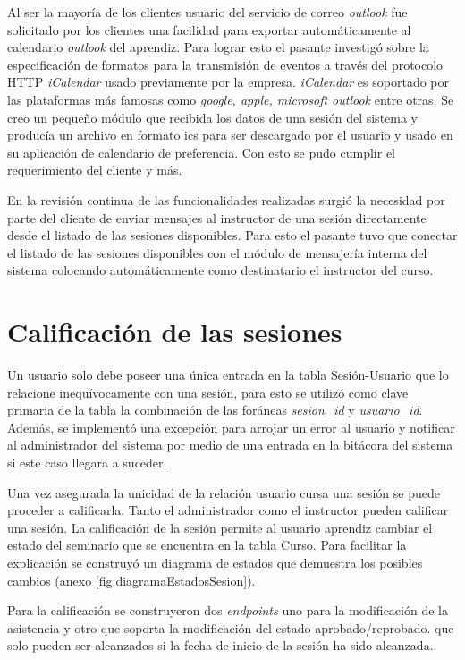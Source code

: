 	Al ser la mayoría de los clientes usuario del servicio de correo \emph{outlook} fue solicitado por los clientes una facilidad para exportar automáticamente al calendario \emph{outlook} del aprendiz. Para lograr esto el pasante investigó sobre la especificación de formatos para la transmisión de eventos a través del protocolo HTTP \emph{iCalendar} usado previamente por la empresa. \emph{iCalendar} es soportado por las plataformas más famosas como \emph{google, apple, microsoft outlook} entre otras. Se creo un pequeño módulo que recibida los datos de una sesión del sistema y producía un archivo en formato ics para ser descargado por el usuario y usado en su aplicación de calendario de preferencia. Con esto se pudo cumplir el requerimiento del cliente y más.

	En la revisión continua de las funcionalidades realizadas surgió la necesidad por parte del cliente de enviar mensajes al instructor de una sesión directamente desde el listado de las sesiones disponibles. Para esto el pasante tuvo que conectar el listado de las sesiones disponibles con el módulo de mensajería interna del sistema colocando automáticamente como destinatario el instructor del curso.

	\section{Calificación de las sesiones} %
	\label{sec:calificacion_de_las_sesiones}
	
	Un usuario solo debe poseer una única entrada en la tabla Sesión-Usuario que lo relacione inequívocamente con una sesión, para esto se utilizó como clave primaria de la tabla la combinación de las foráneas \emph{sesion\_id} y \emph{usuario\_id}. Además, se implementó una excepción para arrojar un error al usuario y notificar al administrador del sistema por medio de una entrada en la bitácora del sistema si este caso llegara a suceder.

	Una vez asegurada la unicidad de la relación usuario cursa una sesión se puede proceder a calificarla. Tanto el administrador como el instructor pueden calificar una sesión. La calificación de la sesión permite al usuario aprendiz cambiar el estado del seminario que se encuentra en la tabla Curso. Para facilitar la explicación se construyó un diagrama de estados que demuestra los posibles cambios (anexo \ref{fig:diagramaEstadosSesion}). 

	Para la calificación se construyeron dos \emph{endpoints} uno para la modificación de la asistencia y otro que soporta la modificación del estado aprobado/reprobado. que solo pueden ser alcanzados si la fecha de inicio de la sesión ha sido alcanzada.

